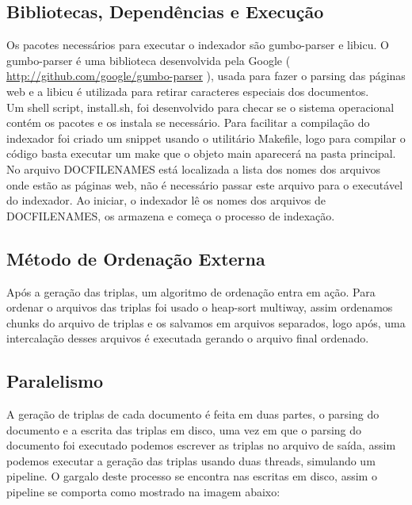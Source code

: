\documentclass[11pt]{article}
\begin{document}
\subsection{Bibliotecas, Dependências e Execução}
Os pacotes necessários para executar o indexador são gumbo-parser e libicu. O gumbo-parser  é uma biblioteca desenvolvida pela Google ( \url{http://github.com/google/gumbo-parser} ), usada para fazer o parsing das páginas web e a libicu é utilizada para retirar caracteres especiais dos documentos.\\
Um shell script, install.sh, foi desenvolvido para checar se o sistema operacional contém os pacotes e os instala se necessário.
Para facilitar a compilação do indexador foi criado um snippet usando o utilitário Makefile, logo para compilar o código basta executar um make que o objeto main aparecerá na pasta principal.\\
No arquivo DOCFILENAMES está localizada a lista dos nomes dos arquivos onde estão as páginas web, não é necessário passar este arquivo para o executável do indexador. Ao iniciar, o indexador lê os nomes dos arquivos de DOCFILENAMES, os armazena e começa o processo de indexação.


\subsection{Método de Ordenação Externa}
Após a geração das triplas, um algoritmo de ordenação entra em ação. Para ordenar o arquivos das triplas foi usado o heap-sort multiway, assim ordenamos chunks do arquivo de triplas e os salvamos em arquivos separados, logo após, uma intercalação desses arquivos é executada gerando o arquivo final ordenado.


\subsection{Paralelismo}
A geração de triplas de cada documento é feita em duas partes, o parsing do documento e a escrita das triplas em disco, uma vez em que o parsing do documento foi executado podemos escrever as triplas no arquivo de saída, assim podemos executar a geração das triplas usando duas threads, simulando um pipeline. O gargalo deste processo se encontra nas escritas em disco, assim o pipeline se comporta como mostrado na imagem abaixo:


\end{document}
